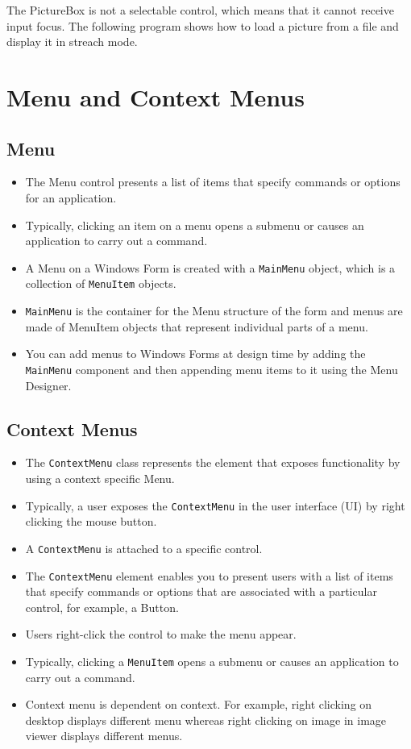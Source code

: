 The PictureBox is not a selectable control, which means that it cannot receive input focus. The following {\cs} program shows how to load a picture from a file and display it in streach mode.



\section{Menu and Context Menus}
\subsection{Menu}
\begin{itemize}
	\item The Menu control presents a list of items that specify commands or options for an application.
	\item Typically, clicking an item on a menu opens a submenu or causes an application to carry out a
	command. 
	\item A Menu on a Windows Form is created with a \texttt{MainMenu} object, which is a collection
	of \texttt{MenuItem} objects. 
	\item \texttt{MainMenu} is the container for the Menu structure of the form and menus are
	made of MenuItem objects that represent individual parts of a menu. 
	\item You can add menus to Windows Forms at design time by adding the \texttt{MainMenu} component and then appending menu
	items to it using the Menu Designer.
\end{itemize}



\subsection{Context Menus}
\begin{itemize}
	\item The \texttt{ContextMenu} class represents the element that exposes functionality by using a context specific Menu. 
	\item Typically, a user exposes the \texttt{ContextMenu} in the user interface (UI) by right clicking the mouse button. 
	\item A \texttt{ContextMenu} is attached to a specific control. 
	\item The \texttt{ContextMenu} element enables you to present users with a list of items that specify commands or options that are
	associated with a particular control, for example, a Button. 
	\item Users right-click the control to make the	menu appear. 
	\item Typically, clicking a \texttt{MenuItem} opens a submenu or causes an application to carry out	a command.
	\item Context menu is dependent on context. For example, right clicking on desktop displays different menu whereas right clicking on image in image viewer displays different menus.
\end{itemize}


